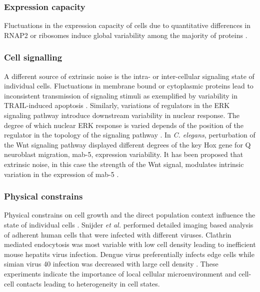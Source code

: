\subsubsection{Expression capacity}

Fluctuations in the expression capacity of cells due to quantitative differences in RNAP2 or ribosomes induce global variability among the majority of proteins \citep{Colman-Lerner2005a}.

\subsubsection{Cell signalling}

A different source of extrinsic noise is the intra- or inter-cellular signaling state of individual cells. Fluctuations in membrane bound or cytoplasmic proteins lead to inconsistent transmission of signaling stimuli as exemplified by variability in TRAIL-induced apoptosis \citep{Spencer2009}. Similarly, variations of regulators in the ERK signaling pathway introduce downstream variability in nuclear response. The degree of which nuclear ERK response is varied depends of the position of the regulator in the topology of the signaling pathway \citep{Iwamoto2016}. In \textit{C. elegans}, perturbation of the Wnt signaling pathway displayed different degrees of the key Hox gene for Q neuroblast migration, mab-5, expression variability. It has been proposed that extrinsic noise, in this case the strength of the Wnt signal, modulates intrinsic variation in the expression of mab-5 \citep{Ji2013}. 

\subsubsection{Physical constrains}

Physical constrains on cell growth and the direct population context influence the state of individual cells \citep{Battich2015a}. Snijder \textit{et al.} performed detailed imaging based analysis of adherent human cells that were infected with different viruses. Clathrin mediated endocytosis was most variable with low cell density leading to inefficient mouse hepatits virus infection. Dengue virus preferentially infects edge cells while simian virus 40 infection was decreased with large cell density \citep{Snijder2009}. These experiments indicate the importance of local cellular microenvironment and cell-cell contacts leading to heterogeneity in cell states. 

